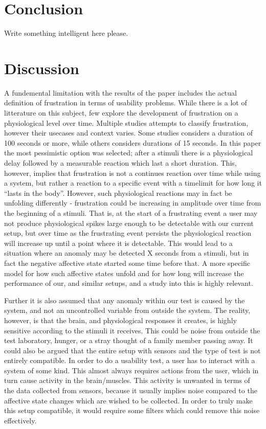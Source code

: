 \section{Conclusion}
Write something intelligent here please.

\section{Discussion}
A fundemental limitation with the results of the paper includes the actual definition of frustration in terms of usability problems. 
While there is a lot of litterature on this subject, few explore the development of frustration on a physiological level over time. 
Multiple studies attempts to classify frustration, however their usecases and context varies. 
Some studies considers a duration of 100 seconds or more\cite{machine_learning_100s_gsr}, while others considers durations of 15 seconds\cite{brainwave_signals_frustration}.
In this paper the most pessimistic option was selected; after a stimuli there is a physiological delay followed by a measurable reaction which last a short duration.
This, however, implies that frustration is not a continues reaction over time while using a system, but rather a reaction to a specific event with a timelimit for how long it ``lasts in the body''.
However, such physiological reactions may in fact be unfolding differently - frustration could be increasing in amplitude over time from the beginning of a stimuli. 
That is, at the start of a frustrating event a user may not produce physiological spikes large enough to be detectable with our current setup, but over time as the frustrating event persists the physiological reaction will increase up until a point where it is detectable. 
This would lead to a situation where an anomaly may be detected X seconds from a stimuli, but in fact the negative affective state started some time before that.
A more specific model for how such affective states unfold and for how long will increase the performance of our, and similar setups, and
a study into this is highly relevant.

Further it is also assumed that any anomaly within our test is caused by the system, and not an uncontrolled variable from outside the system. 
The reality, however, is that the brain, and physiological responses it creates, is highly sensitive according to the stimuli it receives.
This could be noise from outside the test laboratory, hunger, or a stray thought of a family member passing away. 
It could also be argued that the entire setup with sensors and the type of test is not entirely compatible. 
In order to do a usability test, a user has to interact with a system of some kind. 
This almost always requires actions from the user, which in turn cause activity in the brain/muscles. 
This activity is unwanted in terms of the data collected from sensors, because it usually implies noise compared to the affective state changes which are wished to be collected. In order to truly make this setup compatible, it would require some filters which could remove this noise effectively.

